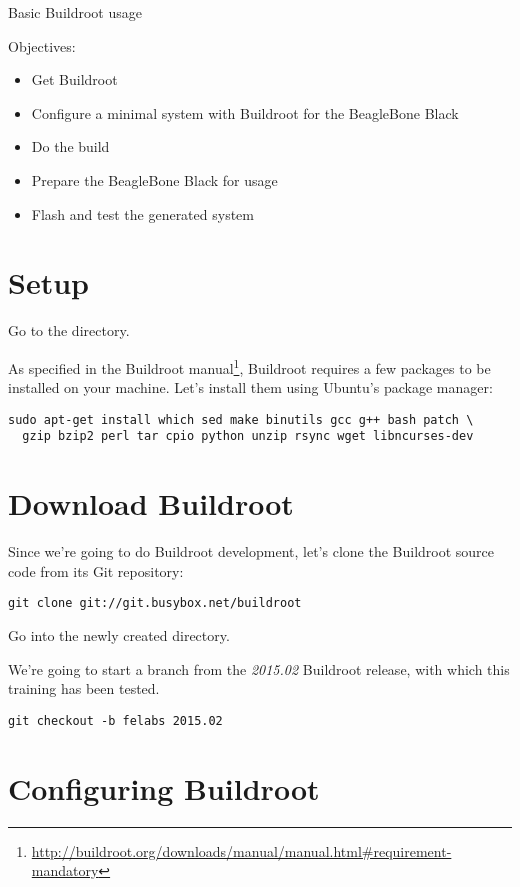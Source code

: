 \subchapter
{Basic Buildroot usage}
{Objectives:
  \begin{itemize}
  \item Get Buildroot
  \item Configure a minimal system with Buildroot for the BeagleBone
    Black
  \item Do the build
  \item Prepare the BeagleBone Black for usage
  \item Flash and test the generated system
  \end{itemize}
}

\section{Setup}

Go to the  directory.

As specified in the Buildroot
manual\footnote{\url{http://buildroot.org/downloads/manual/manual.html\#requirement-mandatory}},
Buildroot requires a few packages to be installed on your
machine. Let's install them using Ubuntu's package manager:

\begin{verbatim}
sudo apt-get install which sed make binutils gcc g++ bash patch \
  gzip bzip2 perl tar cpio python unzip rsync wget libncurses-dev
\end{verbatim}

\section{Download Buildroot}

Since we're going to do Buildroot development, let's clone the
Buildroot source code from its Git repository:

\begin{verbatim}
git clone git://git.busybox.net/buildroot
\end{verbatim}

Go into the newly created  directory.

We're going to start a branch from the {\em 2015.02} Buildroot
release, with which this training has been tested.

\begin{verbatim}
git checkout -b felabs 2015.02
\end{verbatim}

\section{Configuring Buildroot}

